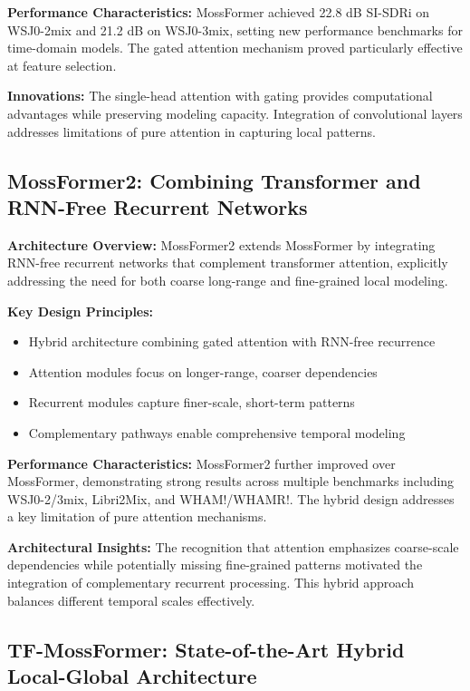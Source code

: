 \documentclass[conference]{IEEEtran}
\begin{document}
\textbf{Performance Characteristics:} MossFormer achieved 22.8 dB SI-SDRi on WSJ0-2mix and 21.2 dB on WSJ0-3mix, setting new performance benchmarks for time-domain models. The gated attention mechanism proved particularly effective at feature selection.

\textbf{Innovations:} The single-head attention with gating provides computational advantages while preserving modeling capacity. Integration of convolutional layers addresses limitations of pure attention in capturing local patterns.

\subsection{MossFormer2: Combining Transformer and RNN-Free Recurrent Networks}

\textbf{Architecture Overview:} MossFormer2 \cite{zhao2024mossformer2} extends MossFormer by integrating RNN-free recurrent networks that complement transformer attention, explicitly addressing the need for both coarse long-range and fine-grained local modeling.

\textbf{Key Design Principles:}
\begin{itemize}
    \item Hybrid architecture combining gated attention with RNN-free recurrence
    \item Attention modules focus on longer-range, coarser dependencies
    \item Recurrent modules capture finer-scale, short-term patterns
    \item Complementary pathways enable comprehensive temporal modeling
\end{itemize}

\textbf{Performance Characteristics:} MossFormer2 further improved over MossFormer, demonstrating strong results across multiple benchmarks including WSJ0-2/3mix, Libri2Mix, and WHAM!/WHAMR!. The hybrid design addresses a key limitation of pure attention mechanisms.

\textbf{Architectural Insights:} The recognition that attention emphasizes coarse-scale dependencies while potentially missing fine-grained patterns motivated the integration of complementary recurrent processing. This hybrid approach balances different temporal scales effectively.

\subsection{TF-MossFormer: State-of-the-Art Hybrid Local-Global Architecture}
\end{document}
